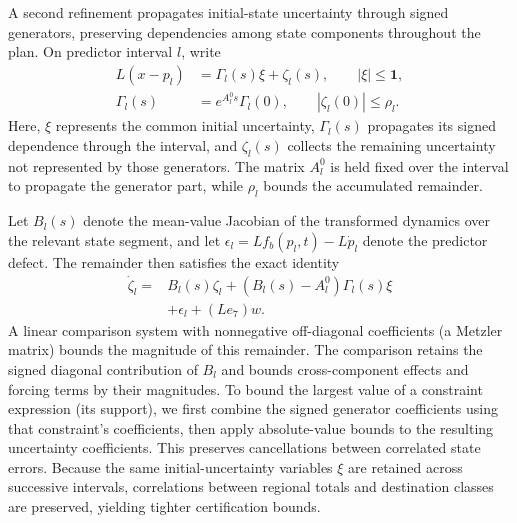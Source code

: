 \documentclass[journal,10pt]{IEEEtran}
\begin{document}
A second refinement propagates initial-state uncertainty through signed
generators, preserving dependencies among state components throughout the plan. On predictor interval $l$, write
\begin{equation}
 \begin{aligned}
 L(x-p_l)&=\Gamma_l(s)\xi+\zeta_l(s),\qquad |\xi|\le\mathbf1,\\
 \Gamma_l(s)&=e^{A_l^0s}\Gamma_l(0),\qquad |\zeta_l(0)|\le\rho_l.
 \end{aligned}
 \label{eq:structure-affine-set}
\end{equation}
Here, $\xi$ represents the common initial uncertainty, $\Gamma_l(s)$ propagates
its signed dependence through the interval, and $\zeta_l(s)$ collects the
remaining uncertainty not represented by those generators. The matrix
$A_l^0$ is held fixed over the interval to propagate the generator part, while
$\rho_l$ bounds the accumulated remainder.

Let $B_l(s)$ denote the mean-value Jacobian of the transformed dynamics over
the relevant state segment, and let
$\epsilon_l=L f_b(p_l,t)-L\dot p_l$ denote the predictor defect. The remainder
then satisfies the exact identity
\begin{equation}
 \begin{aligned}
 \dot\zeta_l={}&B_l(s)\zeta_l+(B_l(s)-A_l^0)\Gamma_l(s)\xi\\
              &+\epsilon_l+(Le_7)w.
 \end{aligned}
 \label{eq:structure-remainder-identity}
\end{equation}
A linear comparison system with nonnegative off-diagonal coefficients
(a Metzler matrix) bounds the magnitude of this remainder. The comparison
retains the signed diagonal contribution of $B_l$ and bounds cross-component
effects and forcing terms by their magnitudes. To bound the largest value of a constraint expression (its support), we
first combine the signed generator coefficients using that constraint's
coefficients, then apply absolute-value bounds to the resulting uncertainty
coefficients. This preserves cancellations between correlated state errors. Because
the same initial-uncertainty variables $\xi$ are retained across successive
intervals, correlations between regional totals and destination classes are
preserved, yielding tighter certification bounds.
\end{document}
